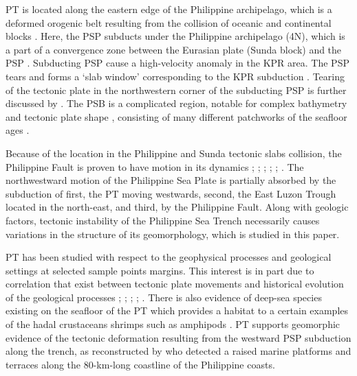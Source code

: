 \documentclass[11pt,a4paper]{report}
\begin{document}
\ac{PT} is located along the eastern edge of the Philippine archipelago, which is a deformed orogenic belt resulting from the collision of oceanic and continental blocks \cite{Karig1983}. Here, the \ac{PSP} subducts under the Philippine archipelago  (4\degree\space N), which is a part of a convergence zone between the Eurasian plate (Sunda block) and the \ac{PSP} \cite{PerezTsutsumi2017}. Subducting \ac{PSP} cause a high-velocity anomaly in the \ac{KPR} area. The \ac{PSP} tears and forms a ‘slab window’ corresponding to the \ac{KPR} subduction \cite{Caoetal2014}. Tearing of the tectonic plate in the northwestern corner of the subducting \ac{PSP} is further discussed by \cite{Linetal2013a}. The \ac{PSB} is a complicated region, notable for complex bathymetry and tectonic plate shape \cite{Yamazakietal2010}, consisting of many different patchworks of the seafloor ages \cite{CizkovaBina2015}. 

Because of the location in the Philippine and Sunda tectonic slabs collision, the Philippine Fault is proven to have motion in its dynamics \cite{Hiranoetal1986}; \cite{Yu1982}; \cite{Yehetal2013}; \cite{Salahetal2009}; \cite{KatoJordan1999}; \cite{Isseetal2010}. The northwestward motion of the Philippine Sea Plate is partially absorbed by the subduction of first, the \ac{PT} moving westwards, second, the East Luzon Trough  located in the north-east, and third, by the Philippine Fault. Along with geologic factors, tectonic instability of the Philippine Sea Trench necessarily causes variations in the structure of its geomorphology, which is studied in this paper.  

\ac{PT} has been studied with respect to the geophysical processes and geological settings at selected sample points margins. This interest is in part due to correlation that exist between tectonic plate movements and historical evolution of the geological processes \cite{HildeLee1984}; \cite{SenoMaruyama1984}; \cite{Ramosetal2012}; \cite{DeschampsLallemand2003}; \cite{Chadwicketal2018}. There is also evidence of deep-sea species existing on the seafloor of the \ac{PT} which provides a habitat to a certain examples of the hadal crustaceans shrimps such as amphipods \cite{Hessleretal1978}. \ac{PT} supports geomorphic evidence of the tectonic deformation resulting from the westward \ac{PSP} subduction  along the trench, as reconstructed by \cite{Ramosetal2012} who detected a raised marine platforms and terraces along the 80-km-long coastline of the Philippine coasts. 
\end{document}
